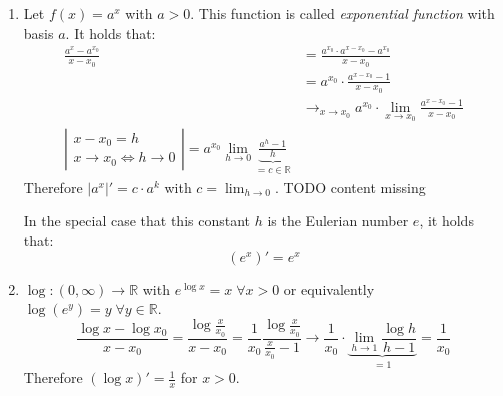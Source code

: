 \documentclass[a4paper,landscape,twocolumn]{article}
\theoremstyle{definition}
\newcommand\abs[1]{\left|#1\right|}
\begin{document}
\begin{enumerate}
  \item Let $f(x) = a^x$ with $a > 0$. This function is called
    \emph{exponential function} with basis $a$. It holds that:
    \begin{align*}
      \frac{a^x - a^{x_0}}{x - x_0}
        &= \frac{a^{x_0} \cdot a^{x - x_0} - a^{x_0}}{x - x_0} \\
        &= a^{x_0} \cdot \frac{a^{x - x_0} - 1}{x - x_0} \\
        &\to_{x \to x_0} a^{x_0} \cdot \lim_{x \to x_0} \frac{a^{x - x_0} - 1}{x - x_0} \\
        \abs{
          \begin{array}{c}
            x - x_0 = h \\
            x \to x_0 \Leftrightarrow h \to 0
          \end{array}
        } = a^{x_0} \lim_{h \to 0} \underbrace{\frac{a^h - 1}{h}}_{= c \in \mathbb R}
    \end{align*}
    Therefore $\abs{a^x}' = c \cdot a^k$ with $c = \lim_{h\to 0}$.
    TODO content missing

    In the special case that this constant $h$ is the Eulerian number $e$, it holds that:
    \[ (e^x)' = e^x \]
  \item $\log: (0, \infty) \to \mathbb R$ with $e^{\log{x}} = x \;\forall x > 0$
    or equivalently $\log(e^y) = y \;\forall y \in \mathbb R$.
    \[
      \frac{\log{x} - \log{x_0}}{x - x_0}
      = \frac{\log\frac x{x_0}}{x - x_0}
      = \frac1{x_0} \frac{\log{\frac{x}{x_0}}}{\frac x{x_0} - 1}
      \to \frac1{x_0} \cdot \underbrace{\lim_{h\to1} \frac{\log{h}}{h - 1}}_{= 1} = \frac1{x_0}
    \]
    Therefore $(\log{x})' = \frac1x$ for $x > 0$.
\end{enumerate}
\end{document}
